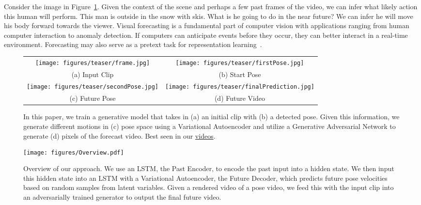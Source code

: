 Consider the image in Figure~\ref{teaser}. Given the context of the scene and perhaps a few past frames of the video, we can infer what likely action this human will perform. This man is outside in the snow with skis. What is he going to do in the near future? We can infer he will move his body forward towards the viewer. Visual forecasting is a fundamental part of computer vision with applications ranging from human computer interaction to anomaly detection. If computers can anticipate events before they occur, they can better interact in a real-time environment. Forecasting may also serve as a pretext task for representation learning~\cite{DoerschThesis16, Vondrick16, Walker16}.

\begin{figure}
\begin{tabular}{ cc }
\texttt{[image: figures/teaser/frame.jpg]} &
\texttt{[image: figures/teaser/firstPose.jpg]} \\
{\footnotesize (a) Input Clip} &  {\footnotesize (b) Start Pose} \\
\texttt{[image: figures/teaser/secondPose.jpg]} &
\texttt{[image: figures/teaser/finalPrediction.jpg]} \\
{\footnotesize (c) Future Pose } & {\footnotesize (d) Future Video} \\
\end{tabular}  
\vspace{0.1in}
\caption{In this paper, we train a generative model that takes in (a) an initial clip with (b) a detected pose. Given this information, we generate different motions in (c) pose space using a Variational Autoencoder and utilize a Generative Adversarial Network to generate (d) pixels of the forecast video. Best seen in our \href{http://www.cs.cmu.edu/~jcwalker/POS/POS.html}{videos}.}
\label{teaser}
\vspace{-0.2in}
\end{figure}


\begin{figure*}
\centering
\texttt{[image: figures/Overview.pdf]}
\vspace{-0.2in}
\caption{Overview of our approach. We use an LSTM, the Past Encoder, to encode the past input into a hidden state. We then input this hidden state into an LSTM with a Variational Autoencoder, the Future Decoder, which predicts future pose velocities based on random samples from latent variables. Given a rendered video of a pose video, we feed this with the input clip into an adversarially trained generator to output the final future video.}
\vspace{-0.2in}
\label{fig:Overview}
\end{figure*}

